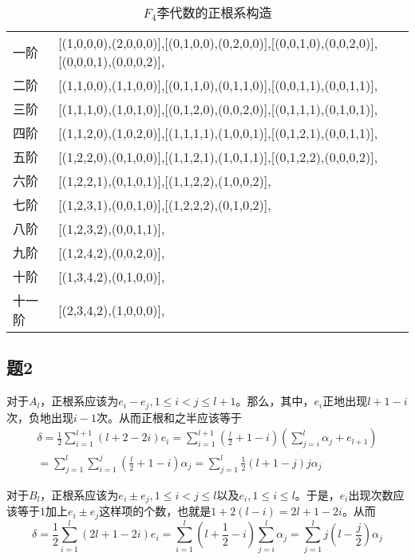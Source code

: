\documentclass{ctexart}
\begin{document}
	\begin{table}[!htbp]
		\centering
		\begin{tabular}{ll}
			一阶 & [(1,0,0,0),(2,0,0,0)],[(0,1,0,0),(0,2,0,0)],[(0,0,1,0),(0,0,2,0)],[(0,0,0,1),(0,0,0,2)], \\
			二阶 & [(1,1,0,0),(1,1,0,0)],[(0,1,1,0),(0,1,1,0)],[(0,0,1,1),(0,0,1,1)], \\
			三阶 & [(1,1,1,0),(1,0,1,0)],[(0,1,2,0),(0,0,2,0)],[(0,1,1,1),(0,1,0,1)], \\
			四阶 & [(1,1,2,0),(1,0,2,0)],[(1,1,1,1),(1,0,0,1)],[(0,1,2,1),(0,0,1,1)], \\
			五阶 & [(1,2,2,0),(0,1,0,0)],[(1,1,2,1),(1,0,1,1)],[(0,1,2,2),(0,0,0,2)], \\
			六阶 & [(1,2,2,1),(0,1,0,1)],[(1,1,2,2),(1,0,0,2)], \\
			七阶 & [(1,2,3,1),(0,0,1,0)],[(1,2,2,2),(0,1,0,2)], \\
			八阶 & [(1,2,3,2),(0,0,1,1)], \\
			九阶 & [(1,2,4,2),(0,0,2,0)], \\
			十阶 & [(1,3,4,2),(0,1,0,0)], \\
			十一阶 & [(2,3,4,2),(1,0,0,0)], \\
		\end{tabular}
		\caption{$F_4$李代数的正根系构造}
		\label{table:F4Roots}
	\end{table}

	\subsection{题2}
	
	对于$A_l$，正根系应该为$e_i-e_j,1\leq i<j\leq l+1$。那么，其中，$e_i$正地出现$l+1-i$次，负地出现$i-1$次。从而正根和之半应该等于
	\begin{multline}
	\delta=\frac{1}{2}\sum_{i=1}^{l+1}(l+2-2i)e_i=\sum_{i=1}^{l+1}\left(\frac l2+1-i\right)\left(\sum_{j=i}^l \alpha_j+e_{l+1}\right)\\=\sum_{j=1}^l\sum_{i=1}^j\left(\frac l2+1-i\right)\alpha_j=\sum_{j=1}^l\frac{1}{2}(l+1-j)j\alpha_j
	\end{multline}
	
	对于$B_l$，正根系应该为$e_i\pm e_j,1\leq i<j\leq l$以及$e_i,1\leq i\leq l$。于是，$e_i$出现次数应该等于$1$加上$e_i\pm e_j$这样项的个数，也就是$1+2(l-i)=2l+1-2i$。从而
	\begin{equation}
	\delta=\frac{1}{2}\sum_{i=1}^l (2l+1-2i)e_i=\sum_{i=1}^l\left(l+\frac{1}{2}-i\right)\sum_{j=i}^l\alpha_j=\sum_{j=1}^lj\left(l-\frac{j}{2}\right)\alpha_j
	\end{equation}
	
\end{document}
